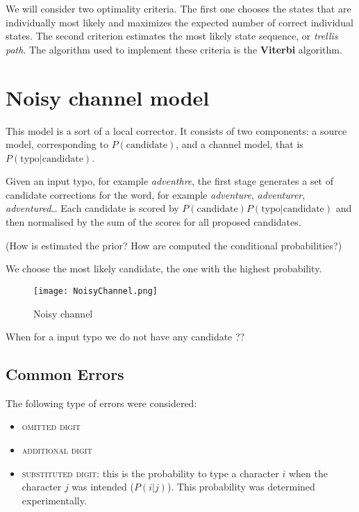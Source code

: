 We will consider two optimality criteria. The first one chooses the states that are individually most likely and maximizes the 
expected number of correct individual states. The second criterion estimates the most likely state sequence, or 
\textit{trellis path}. The algorithm used to implement these criteria is the \textbf{Viterbi} algorithm. %

\section{Noisy channel model}

This model is a sort of a local corrector. It consists of two components: a source model, corresponding to 
$P(\text{candidate})$, and a channel model, 
that is $P(\text{typo}|\text{candidate})$.


Given an input typo, for example \textsl{adventhre}, the first stage generates a set of candidate corrections for the word, 
for example \textsl{adventure}, \textsl{adventurer}, \textsl{adventured}…
Each candidate is scored by $P(\text{candidate})P(\text{typo}|\text{candidate})$ and then normalised by the sum of the 
scores for all proposed candidates.

(How is estimated the prior? How are computed the conditional probabilities?)%

We choose the most likely candidate, the one with the highest probability.

\begin{figure}[H]
	\centering
	\texttt{[image: NoisyChannel.png]}
	\caption{Noisy channel}
	\label{fig:noisychannel}
\end{figure}

When for a input typo we do not have any candidate ?? %


\subsection{Common Errors}
The following type of errors were considered:
\begin{itemize}
	\item \textsc{omitted digit}
	\item \textsc{additional digit}
	\item \textsc{substituted digit}: this is the probability to type a
	character $i$ when the character $j$ was intended ($P(i|j)$). This 
	probability was determined experimentally. %
\end{itemize}

